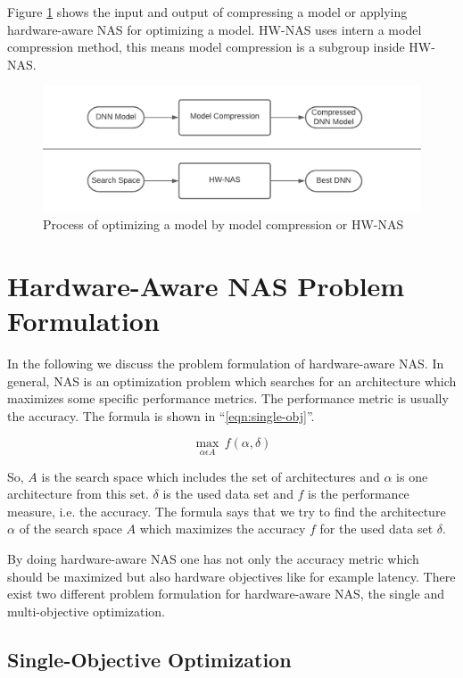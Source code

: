 \documentclass[conference]{IEEEtran}
\begin{document}
Figure \ref{fig:Optimization} \cite{bib1} shows the input and output of compressing a model or applying hardware-aware NAS for optimizing a model. HW-NAS uses intern a model compression method, this means model compression is a subgroup inside HW-NAS.

\begin{figure}[htbp]
\centerline{\includegraphics[width=\linewidth]{Optimization.png}}
\caption{Process of optimizing a model by model compression or HW-NAS \cite{bib1}}
\label{fig:Optimization}
\end{figure}

\section{Hardware-Aware NAS Problem Formulation}
\label{section:ProblemFormulation}
In the following we discuss the problem formulation of hardware-aware NAS. In general, NAS is an optimization problem which searches for an architecture which maximizes some specific performance metrics. The performance metric is usually the accuracy. The formula is shown in ``\eqref{eqn:single-obj}''. 
 
\begin{equation}
\label{eqn:single-obj}
\max_{\alpha\epsilon A}\,f(\alpha, \delta)
\end{equation}

So, $A$ is the search space which includes the set of architectures and $\alpha$ is one architecture from this set. $\delta$ is the used data set and $f$ is the performance measure, i.e. the accuracy. The formula says that we try to find the architecture $\alpha$ of the search space $A$ which maximizes the accuracy $f$ for the used data set $\delta$. 
 
By doing hardware-aware NAS one has not only the accuracy metric which should be maximized but also hardware objectives like for example latency. There exist two different problem formulation for hardware-aware NAS, the single and multi-objective optimization.

\subsection{Single-Objective Optimization}
\end{document}
